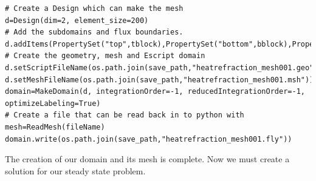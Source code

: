 \begin{verbatim}
# Create a Design which can make the mesh
d=Design(dim=2, element_size=200)
# Add the subdomains and flux boundaries.
d.addItems(PropertySet("top",tblock),PropertySet("bottom",bblock),PropertySet("linebottom",l12))
# Create the geometry, mesh and Escript domain
d.setScriptFileName(os.path.join(save_path,"heatrefraction_mesh001.geo"))
d.setMeshFileName(os.path.join(save_path,"heatrefraction_mesh001.msh"))
domain=MakeDomain(d, integrationOrder=-1, reducedIntegrationOrder=-1, optimizeLabeling=True)
# Create a file that can be read back in to python with mesh=ReadMesh(fileName)
domain.write(os.path.join(save_path,"heatrefraction_mesh001.fly"))
\end{verbatim}
The creation of our domain and its mesh is complete. Now we must create a solution for our steady state problem.

